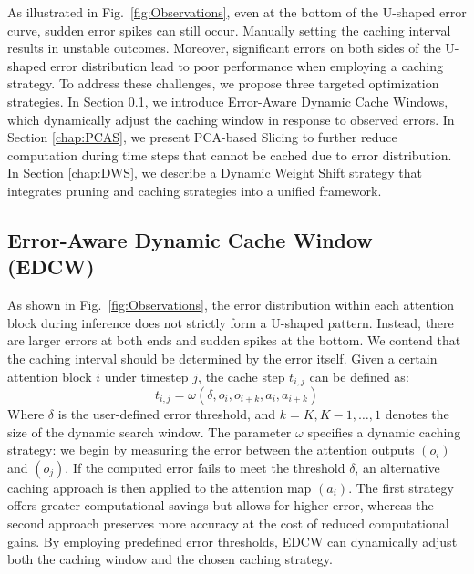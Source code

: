 As illustrated in Fig.~\ref{fig:Observations}, even at the bottom of the U-shaped error curve, sudden error spikes can still occur. Manually setting the caching interval results in unstable outcomes. Moreover, significant errors on both sides of the U-shaped error distribution lead to poor performance when employing a caching strategy. To address these challenges, we propose three targeted optimization strategies. In Section \ref{chap:EDCW}, we introduce Error-Aware Dynamic Cache Windows, which dynamically adjust the caching window in response to observed errors. In Section \ref{chap:PCAS}, we present PCA-based Slicing to further reduce computation during time steps that cannot be cached due to error distribution. In Section \ref{chap:DWS}, we describe a Dynamic Weight Shift strategy that integrates pruning and caching strategies into a unified framework.
\subsection{Error-Aware Dynamic Cache Window (EDCW)}
\label{chap:EDCW}
As shown in Fig.~\ref{fig:Observations}, the error distribution within each attention block during inference does not strictly form a U-shaped pattern. Instead, there are larger errors at both ends and sudden spikes at the bottom. We contend that the caching interval should be determined by the error itself. Given a certain attention block $i$ under timestep $j$, the cache step $t_{i,j} $ can be defined as:
\begin{equation}
    t_{i,j}=\omega(\delta , o_{i}, o_{i+k}, a_{i}, a_{i+k})
\end{equation} 
Where \(\delta\) is the user-defined error threshold, and \(k=K,K-1,\ldots,1\) denotes the size of the dynamic search window. The parameter \(\omega\) specifies a dynamic caching strategy: we begin by measuring the error between the attention outputs \((o_i)\) and \((o_j)\). If the computed error fails to meet the threshold \(\delta\), an alternative caching approach is then applied to the attention map \((a_i)\). The first strategy offers greater computational savings but allows for higher error, whereas the second approach preserves more accuracy at the cost of reduced computational gains. By employing predefined error thresholds, EDCW can dynamically adjust both the caching window and the chosen caching strategy. 



